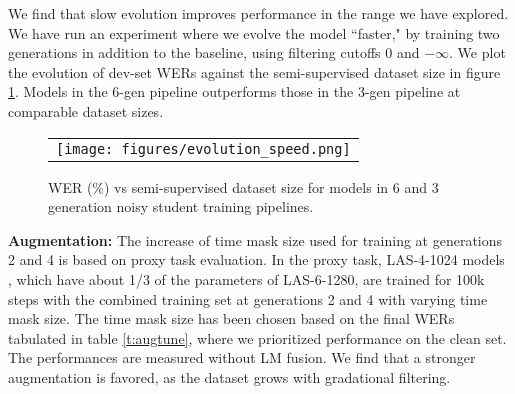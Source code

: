\documentclass[a4paper]{article}
\begin{document}
We find that slow evolution improves performance in the range we have explored. We have run an experiment where we evolve the model ``faster," by training two generations in addition to the baseline, using filtering cutoffs 0 and $-\infty$. We plot the evolution of dev-set WERs against the semi-supervised dataset size in figure \ref{f:evolutionspeed}. Models in the 6-gen pipeline outperforms those in the 3-gen pipeline at comparable dataset sizes.

\begin{figure}[h]
  \centering
  \vskip -0.05in
  \begin{tabular}{c}
  \texttt{[image: figures/evolution\_speed.png]}
  \end{tabular}
  \vskip -0.05in
  \caption{WER (\%) vs semi-supervised dataset size for models in 6 and 3 generation noisy student training pipelines.}
  \label{f:evolutionspeed}
  \vskip -0.1in
\end{figure}

\noindent\textbf{Augmentation:} The increase of time mask size used for training at generations 2 and 4 is based on proxy task evaluation. In the proxy task, LAS-4-1024 models \cite{specaugment,lasbaseline}, which have about 1/3 of the parameters of LAS-6-1280, are trained for 100k steps with the combined training set at generations 2 and 4 with varying time mask size. The time mask size has been chosen based on the final WERs tabulated in table \ref{t:augtune}, where we prioritized performance on the clean set. The performances are measured without LM fusion. We find that a stronger augmentation is favored, as the dataset grows with gradational filtering.

\begin{table}[h!]
  \vskip -0.05in
  \caption{Proxy task WER (\%) for LibriSpeech 100-860.}
  \label{t:augtune}
  \vskip -0.05in
  \centering
  \small
  \vskip -0.05in
\end{table}
\end{document}
